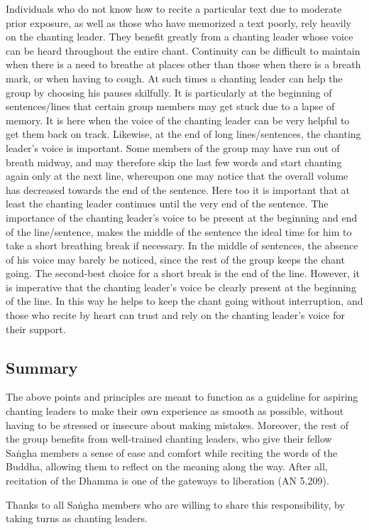   Individuals who do not know how to recite a particular text due to moderate prior exposure, as well as those who have memorized a text poorly, rely heavily on the chanting leader. They benefit greatly from a chanting leader whose voice can be heard throughout the entire chant. Continuity can be difficult to maintain when there is a need to breathe at places other than those when there is a breath mark, or when having to cough. At such times a chanting leader can help the group by choosing his pauses skilfully. It is particularly at the beginning of sentences/lines that certain group members may get stuck due to a lapse of memory. It is here when the voice of the chanting leader can be very helpful to get them back on track. Likewise, at the end of long lines/sentences, the chanting leader's voice is important. Some members of the group may have run out of breath midway, and may therefore skip the last few words and start chanting again only at the next line, whereupon one may notice that the overall volume has decreased towards the end of the sentence. Here too it is important that at least the chanting leader continues until the very end of the sentence. The importance of the chanting leader's voice to be present at the beginning and end of the line/sentence, makes the middle of the sentence the ideal time for him to take a short breathing break if necessary. In the middle of sentences, the absence of his voice may barely be noticed, since the rest of the group keeps the chant going. The second-best choice for a short break is the end of the line. However, it is imperative that the chanting leader's voice be clearly present at the beginning of the line. In this way he helps to keep the chant going without interruption, and those who recite by heart can trust and rely on the chanting leader's voice for their support.

\ifbfive\clearpage\fi

\subsection*{Summary}

  The above points and principles are meant to function as a guideline for aspiring chanting leaders to make their own experience as smooth as possible, without having to be stressed or insecure about making mistakes. Moreover, the rest of the group benefits from well-trained chanting leaders, who give their fellow Saṅgha members a sense of ease and comfort while reciting the words of the Buddha, allowing them to reflect on the meaning along the way. After all, recitation of the Dhamma is one of the gateways to liberation (AN 5.209).

  Thanks to all Saṅgha members who are willing to share this responsibility, by taking turns as chanting leaders.

